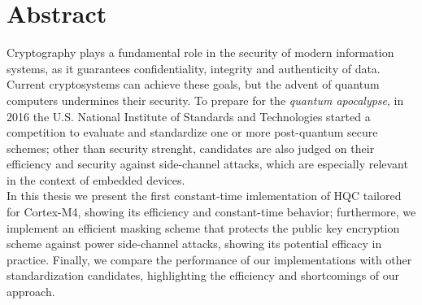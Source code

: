 \documentclass{Configuration_Files/PoliMi3i_thesis}
\theoremstyle{definition}
\theoremstyle{remark}
\begin{document}


\pagestyle{empty} %
\frontmatter %


\startpreamble
\setcounter{page}{1} %

\chapter*{Abstract} 
Cryptography plays a fundamental role in the security of modern information systems, as it guarantees
confidentiality, integrity and authenticity of data. Current cryptosystems can achieve these goals, but
the advent of quantum computers undermines their security.
To prepare for the \emph{quantum apocalypse}, in 2016 the U.S. National Institute of Standards and Technologies
started a competition to evaluate and standardize one or more post-quantum secure schemes; other than security strenght, candidates are also
judged on their efficiency and security against side-channel attacks, which are especially
relevant in the context of embedded devices.\\
In this thesis we present the first constant-time imlementation of HQC tailored for Cortex-M4, showing
its efficiency and constant-time behavior; furthermore, we implement an efficient masking scheme
that protects the public key encryption scheme against power side-channel attacks, showing its
potential efficacy in practice. Finally, we compare the performance of our implementations with other
standardization candidates, highlighting the efficiency and shortcomings of our approach.
\end{document}
